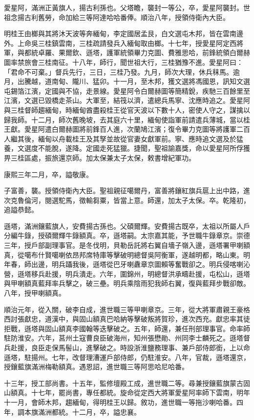 \begin{pinyinscope}
愛星阿，滿洲正黃旗人，揚古利孫也。父塔瞻，襲封一等公，卒，愛星阿襲封。世祖念揚古利舊勞，命加給三等阿達哈哈番俸。順治八年，授領侍衛內大臣。

明桂王由榔與其將沐天波等奔緬甸，李定國居孟艮，白文選屯木邦，皆在雲南邊外。上命吳三桂鎮雲南，三桂疏請發兵入緬甸取由榔。十七年，授愛星阿定西將軍，與都統卓羅、果爾欽、遜塔，護軍統領畢力克圖、費雅思哈，前鋒統領白爾赫圖率禁旅會三桂南征。十八年，師行，聞世祖大行，三桂猶豫不進。愛星阿曰：「君命不可棄。」督兵先行，三日，三桂乃發。九月，師次大理，休兵秣馬。逾月，出騰越，道南甸、隴川、猛卯。十一月，至木邦，獲文選將馮國恩，訊知文選屯錫箔江濱，定國與不協，走景線。愛星阿令白爾赫圖等簡精銳，疾馳三百餘里至江濱，文選已毀橋走茶山。大軍至，結筏以濟，遣總兵馬寧、沈應時追之。愛星阿與三桂督師趨緬甸，時緬甸酋盡殺桂王從官天波以下數十人，密使人守之，謀擒以歸我師。十二月，師次舊晚坡，去其庭六十里，緬甸使詣軍前請遣兵薄城，當以桂王獻。愛星阿遣白爾赫圖將前鋒百人進，次蘭鳩江濱；復令畢力克圖等將護軍二百人繼其後，緬甸以舟載桂王及其孥並故從官妻女獻軍前。寧、應時追文選及於猛養，文選度不能脫，遂降。定國走死猛獵。捷聞，聖祖諭嘉獎，命以愛星阿所俘獲畀三桂區處，振旅還京師。加太保兼太子太保，敕書增紀軍功。

康熙三年二月，卒，謚敬康。

子富善，襲。授領侍衛內大臣。聖祖親征噶爾丹，富善將鑲紅旗兵扈上出中路，進次克魯倫河，閱選駝馬，徵輸芻粟，皆當上意。師還，加太子太保。卒。乾隆初，追謚恭懿。

遜塔，滿洲鑲藍旗人，安費揚古孫也。父碩爾輝。安費揚古既卒，太祖以所屬人戶分編牛錄，授碩爾輝牛錄額真。卒，遜塔嗣。太宗嘉其能，予世職牛錄章京。崇德三年，授戶部副理事官。是冬伐明，貝勒岳託將右翼自墻子嶺入邊，遜塔署甲喇額真，從噶布什賢噶喇依昂邦席特庫等擊破明總督吳阿衡軍，遂越明都，略山東。明年春，師出邊，明兵躡我後，遜塔從巴牙喇纛章京圖賴等奮戰卻之。明兵侵喀喇沁營，遜塔移兵赴援，明兵潰走。六年，圍錦州，明總督洪承疇赴援，屯松山，遜塔與甲喇額真藍拜率兵擊之，破三壘。明兵乘陰雨犯我師右翼，復與藍拜步戰卻敵。八年，授甲喇額真。

順治元年，從入關，破李自成，進世職三等甲喇章京。三年，從大將軍肅親王豪格西討張獻忠，道漢中，與固山額真巴哈納等擊破叛將賀珍，進次西充。獻忠率其徒拒戰，遜塔與固山額真李國翰等迭擊破之。五年，師還，兼任刑部理事官。命率師駐防淮安。六年，莒州土寇曹良臣破海州，知州張懋勛、州同李士麟死之。遜塔督兵赴援，良臣走保馬髻山，進擊破之。時設浙淮鹽務理事、兼戶部侍郎銜，上以命遜塔，駐揚州。七年，改督理漕運戶部侍郎，仍駐淮安。八年，官裁，遜塔還京，授鑲藍旗滿洲梅勒額真。遇恩詔，進世職三等阿思哈尼哈番。

十三年，授工部尚書。十五年，監修壇殿工成，進世職二等。尋兼授鑲藍旗蒙古固山額真。十七年，罷尚書，專任都統。旋命從定西大將軍愛星阿率師下雲南，明年十一月，會師木邦，趨緬甸，得明桂王以歸。敘功，進世職一等拖沙喇哈番。四年，調本旗滿洲都統。十二月，卒，謚忠襄。


\end{pinyinscope}
